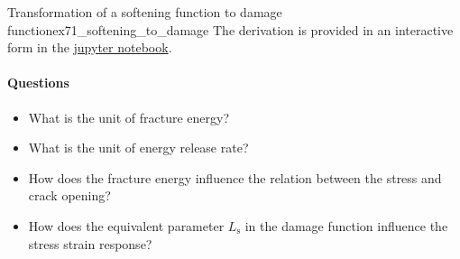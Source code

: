 \documentclass[main.tex]{subfiles}
\begin{document}
\begin{bmcsex}{Transformation of a softening function to damage function}{ex71_softening_to_damage} 
The derivation is provided in an interactive form in the 
\href{http://localhost:8888/tree/Examples/7_2_Crack_softening_law_and_damage_function.ipynb}{jupyter notebook}.

\paragraph{Questions}
\begin{itemize}
\item What is the unit of fracture energy?
\item What is the unit of energy release rate?
\item 
How does the fracture energy influence 
the relation between the stress and crack opening?
\item
How does the equivalent parameter $L_\mathrm{s}$ in the 
damage function influence the stress strain response?
\end{itemize}
\end{bmcsex}
\end{document}
